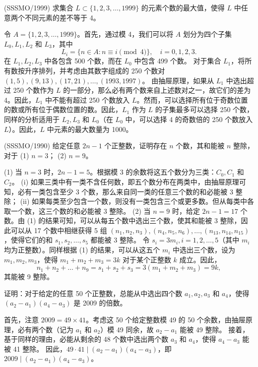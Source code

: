 \begin{questions}
\question (SSSMO/1999) 求集合 $L \subset \{1, 2, 3, \dots, 1999\}$ 的元素个数的最大值，使得 $L$ 中任意两个不同元素的差不等于 4。
\begin{solution}
令 $A = \{1, 2, 3, \dots, 1999\}$。首先，通过模 4，我们可以将 $A$ 划分为四个子集 $L_0, L_1, L_2$ 和 $L_3$，其中
\[
L_i = \{n \in A : n \equiv i \pmod{4}\}, \quad i = 0, 1, 2, 3.
\]
在 $L_1, L_2, L_3$ 中各包含 500 个数，而在 $L_0$ 中包含 499 个数。
对于集合 $L_1$，将所有数按升序排列，并考虑由其数字组成的 250 个数对 $(1, 5), (9, 13), (17, 21), \dots, (1993, 1997)$。
由抽屉原理，如果从 $L_1$ 中选出超过 250 个数作为 $L$ 的一部分，那么必有两个数来自上述数对之一，故它们的差为 4。因此，$L_1$ 中不能有超过 250 个数放入 $L$。然而，可以选择所有位于奇数位置的数或所有位于偶数位置的数。因此，$L_1$ 作为 $L$ 的子集最多可以选择 250 个数，同样的分析适用于 $L_2, L_3$ 和 $L_0$（在 $L_0$ 中，可以选择 4 的奇数倍的 250 个数放入 $L$）。因此，$L$ 中元素的最大数量为 1000。
\end{solution}

\question (SSSMO/1990) 给定任意 $2n - 1$ 个正整数，证明存在 $n$ 个数，其和能被 $n$ 整除，对于 (1) $n = 3$； (2) $n = 9$。
\begin{solution}
(1) 当 $n = 3$ 时，$2n - 1 = 5$。根据模 3 的余数将这五个数分为三类：$C_0, C_1$ 和 $C_2$。
(i) 如果三类中有一类不含任何数，即五个数分布在两类中，由抽屉原理可知，必有一类包含至少 3 个数，那么来自同一类的任意三个数的和必能被 3 整除；
(ii) 如果每类至少包含一个数，则没有一类包含三个或更多数。但从每类中各取一个数，这三个数的和必能被 3 整除。
(2) 当 $n = 9$ 时，给定 $2n - 1 = 17$ 个数。由 (1) 的结果可知，可以从每五个数中选出三个数，使其和能被 3 整除，因此可以从 17 个数中相继获得 5 组 $(n_1, n_2, n_3), (n_4, n_5, n_6), \dots, (n_{13}, n_{14}, n_{15})$，使得它们的和 $s_1, s_2, \dots, s_5$ 都能被 3 整除。
令 $s_i = 3m_i, i = 1, 2, \dots, 5$（其中 $m_i$ 均为正整数）。同样根据 (1) 的结果，可以从这五个 $m_i$ 中选出三个数，设为 $m_1, m_2, m_3$，使得 $m_1 + m_2 + m_3 = 3k$ 对于某个正整数 $k$ 成立。因此，
\[
n_1 + n_2 + \dots + n_9 = s_1 + s_2 + s_3 = 3(m_1 + m_2 + m_3) = 9k,
\]
其能被 9 整除。
\end{solution}

\question 证明：对于给定的任意 50 个正整数，总能从中选出四个数 $a_1, a_2, a_3$ 和 $a_4$，使得 $(a_2 - a_1)(a_4 - a_3)$ 是 2009 的倍数。
\begin{solution}
首先，注意 $2009 = 49 \times 41$。考虑这 50 个给定整数模 49 的 50 个余数，由抽屉原理，必有两个数（记为 $a_1$ 和 $a_2$）模 49 同余，故 $a_2 - a_1$ 能被 49 整除。
接着，基于同样的理由，必能从剩余的 48 个数中选出两个数 $a_3$ 和 $a_4$，使得 $a_4 - a_3$ 能被 41 整除。
因此，$49 \cdot 41 \mid (a_2 - a_1)(a_4 - a_3)$，即 $2009 \mid (a_2 - a_1)(a_4 - a_3)$。
\end{solution}


\end{questions}
